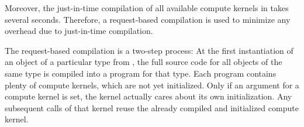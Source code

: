 Moreover, the just-in-time compilation of all available compute kernels in
{\ViennaCL} takes several seconds. Therefore, a request-based compilation is used to minimize any overhead due to just-in-time compilation.

The request-based compilation is a two-step process: At the first instantiation
of an object of a particular type from {\ViennaCL}, the full source code for all objects of the same type is
compiled into a {\OpenCL} program for that type. Each program contains plenty of compute kernels, which are not yet
initialized. Only if an argument for a compute kernel is set, the kernel
actually cares about its own initialization. Any subsequent calls of that
kernel reuse the already compiled and initialized compute kernel.

